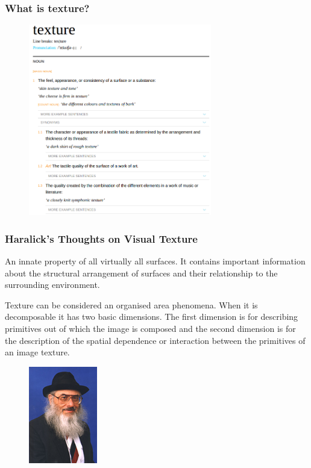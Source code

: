 \documentclass{beamer}
\begin{document}
\begin{frame}
  \frametitle{What is texture?}

  \begin{figure}[h]
    \centering
    \includegraphics[width = 8cm]{def}
  \end{figure}
 
 \end{frame}


\begin{frame}
\frametitle{Haralick's Thoughts on  Visual Texture}
An innate property of all virtually all surfaces. It contains important information about the structural arrangement of surfaces and their relationship to the  surrounding environment.


Texture can be considered an organised area phenomena. When it is decomposable it has two basic dimensions. The first dimension is for describing primitives out of which the image is composed and the second dimension is for the description of the spatial dependence or interaction between the primitives of an image texture.  

\begin{figure}[h]
  \centering
  \includegraphics[width = 3cm]{haralick_robert}
\end{figure}

\end{frame}
\end{document}
